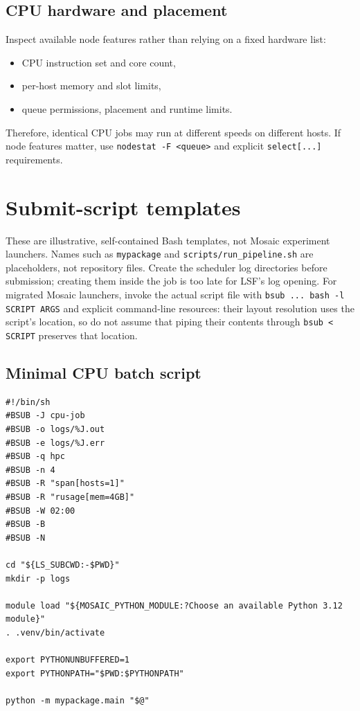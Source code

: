 \documentclass[11pt,a4paper]{article}
\begin{document}
\subsection{CPU hardware and placement}

Inspect available node features rather than relying on a fixed hardware list:

\begin{itemize}[leftmargin=1.5em]
  \item CPU instruction set and core count,
  \item per-host memory and slot limits,
  \item queue permissions, placement and runtime limits.
\end{itemize}

Therefore, identical CPU jobs may run at different speeds on different hosts. If node features matter, use \texttt{nodestat -F <queue>} and explicit \texttt{select[...]} requirements.

\section{Submit-script templates}

These are illustrative, self-contained Bash templates, not Mosaic experiment
launchers. Names such as \texttt{mypackage} and \texttt{scripts/run\_pipeline.sh}
are placeholders, not repository files. Create the scheduler log directories
before submission; creating them inside the job is too late for LSF's log opening.
For migrated Mosaic launchers, invoke the actual script file with
\texttt{bsub ... bash -l SCRIPT ARGS} and explicit command-line resources:
their layout resolution uses the script's location, so do not assume that piping
their contents through \texttt{bsub < SCRIPT} preserves that location.

\subsection{Minimal CPU batch script}

\begin{lstlisting}[style=shell]
#!/bin/sh
#BSUB -J cpu-job
#BSUB -o logs/%J.out
#BSUB -e logs/%J.err
#BSUB -q hpc
#BSUB -n 4
#BSUB -R "span[hosts=1]"
#BSUB -R "rusage[mem=4GB]"
#BSUB -W 02:00
#BSUB -B
#BSUB -N

cd "${LS_SUBCWD:-$PWD}"
mkdir -p logs

module load "${MOSAIC_PYTHON_MODULE:?Choose an available Python 3.12 module}"
. .venv/bin/activate

export PYTHONUNBUFFERED=1
export PYTHONPATH="$PWD:$PYTHONPATH"

python -m mypackage.main "$@"
\end{lstlisting}
\end{document}
